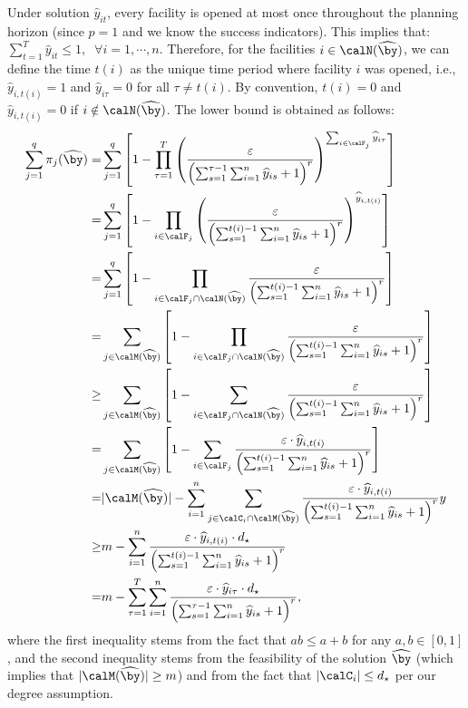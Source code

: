 \documentclass[blindrev]{informs3noheader}
\begin{document}
Under solution $\widehat{y}_{it}$, every facility is opened at most once throughout the planning horizon (since $p=1$ and we know the success indicators). This implies that: $\sum_{t=1}^T\widehat{y}_{it}\leq 1, \;\;\forall i=1,\cdots,n$. Therefore, for the facilities $i\in\calN(\widehat{\by})$, we can define the time $t(i)$ as the unique time period where facility $i$ was opened, i.e., $\widehat{y}_{i,t(i)}=1$ and $\widehat{y}_{i\tau}=0$ for all $\tau\neq t(i)$. By convention, $t(i)=0$ and $\widehat{y}_{i,t(i)}=0$ if $i\notin\calN(\widehat{\by})$. The lower bound is obtained as follows:
\begin{align*}
\sum_{j=1}^q\pi_{j}(\widehat{\by})
 =&\sum_{j=1}^q \left[1-\prod_{\tau=1}^T \left(\frac{\varepsilon}{\left(\sum_{s=1}^{\tau-1}\sum_{i=1}^n \widehat{y}_{is}+1\right)^r}\right)^{\sum_{i \in \calF_j} \widehat{y}_{i\tau}}\right]\\
 =&\sum_{j=1}^q \left[1-\prod_{i \in \calF_j} \left(\frac{\varepsilon}{\left(\sum_{s=1}^{t(i)-1}\sum_{i=1}^n \widehat{y}_{is}+1\right)^r}\right)^{\widehat{y}_{i,t(i)}}\right]\\
 =&\sum_{j=1}^q \left[1-\prod_{i \in \calF_j\cap\calN(\widehat{\by})} \frac{\varepsilon}{\left(\sum_{s=1}^{t(i)-1}\sum_{i=1}^n \widehat{y}_{is}+1\right)^r}\right]\\
 =&\sum_{j\in \calM(\widehat{\by})} \left[1-\prod_{i\in\calF_j\cap\calN(\widehat{\by})} \frac{\varepsilon}{\left(\sum_{s=1}^{t(i)-1}\sum_{i=1}^n \widehat{y}_{is}+1\right)^r}\right]\\
 \geq& \sum_{j\in \calM(\widehat{\by})} \left[1-\sum_{i\in\calF_j\cap\calN(\widehat{\by})} \frac{\varepsilon}{\left(\sum_{s=1}^{t(i)-1}\sum_{i=1}^n \widehat{y}_{is}+1\right)^r}\right]\\
 =&\sum_{j\in \calM(\widehat{\by})} \left[1-\sum_{i \in \calF_j} \frac{\varepsilon\cdot \widehat{y}_{i,t(i)}}{\left(\sum_{s=1}^{t(i)-1}\sum_{i=1}^n \widehat{y}_{is}+1\right)^r}\right]\\
 =&|\calM(\widehat{\by})|- \sum_{i=1}^n \sum_{j \in \calC_i\cap\calM(\widehat{\by})}  \frac{\varepsilon\cdot \widehat{y}_{i,t(i)}}{\left(\sum_{s=1}^{t(i)-1}\sum_{i=1}^n \widehat{y}_{is}+1\right)^r}y\\
 \geq& m-\sum_{i =1}^n \frac{\varepsilon\cdot \widehat{y}_{i,t(i)}\cdot d_\star}{\left(\sum_{s=1}^{t(i)-1}\sum_{i=1}^n \widehat{y}_{is}+1\right)^r}\\
 =& m-\sum_{\tau=1}^T \sum_{i =1}^n \frac{\varepsilon\cdot \widehat{y}_{i\tau}\cdot d_\star}{\left(\sum_{s=1}^{\tau-1}\sum_{i=1}^n \widehat{y}_{is}+1\right)^r},
\end{align*}
where the first inequality stems from the fact that $ab\leq a+b$ for any $a,b\in[0,1]$, and the second inequality stems from the feasibility of the solution $\widehat{\by}$ (which implies that $|\calM(\widehat{\by})|\geq m$) and from the fact that $|\calC_i|\leq d_\star$ per our degree assumption.
\end{document}
